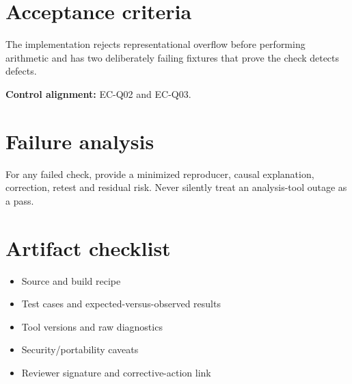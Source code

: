\documentclass[10pt,letterpaper]{article}
\begin{document}
\section{Acceptance criteria}
The implementation rejects representational overflow before performing arithmetic and has two deliberately failing fixtures that prove the check detects defects.

\textbf{Control alignment:} EC-Q02 and EC-Q03.
\section{Failure analysis}
For any failed check, provide a minimized reproducer, causal explanation, correction, retest and residual risk. Never silently treat an analysis-tool outage as a pass.
\section{Artifact checklist}
\begin{itemize}
\item Source and build recipe
\item Test cases and expected-versus-observed results
\item Tool versions and raw diagnostics
\item Security/portability caveats
\item Reviewer signature and corrective-action link
\end{itemize}
\end{document}
